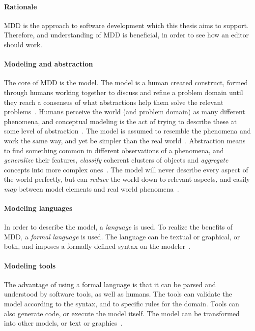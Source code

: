 \paragraph{Rationale}
\Acrfull{MDD} is the approach to software development which this thesis aims to support.
Therefore, and understanding of \acrshort{MDD} is beneficial, in order to see how an editor should work.

\paragraph{Modeling and abstraction}
The core of \acrshort{MDD} is the model.
The model is a human created construct, formed through humans working together to discuss and refine a problem domain until they reach a consensus of what abstractions help them solve the relevant problems~\cite[p.~154]{brambillaModeldrivenSoftwareEngineering2012}.
Humans perceive the world (and problem domain) as many different phenomena, and conceptual modeling is the act of trying to describe these at some level of abstraction~\cite[p.~1,408]{krogstieModelbasedDevelopmentEvolution2012}.
The model is assumed to resemble the phenomena and work the same way, and yet be simpler than the real world~\cite[p.~414]{krogstieModelbasedDevelopmentEvolution2012}.
Abstraction means to find something common in different observations of a phenomena, and \textit{generalize} their features, \textit{classify} coherent clusters of objects and \textit{aggregate} concepts into more complex ones~\cite[p.~1]{brambillaModeldrivenSoftwareEngineering2012}.
The model will never describe every aspect of the world perfectly, but can \textit{reduce} the world down to relevant aspects, and easily \textit{map} between model elements and real world phenomena~\cite[p.~1-2]{brambillaModeldrivenSoftwareEngineering2012}.


\paragraph{Modeling languages}
In order to describe the model, a \textit{language} is used.
To realize the benefits of \acrshort{MDD}, a \textit{formal language} is used.
The language can be textual or graphical, or both, and imposes a formally defined syntax on the modeler~\cite[p.~13]{brambillaModeldrivenSoftwareEngineering2012}.

\paragraph{Modeling tools}
The advantage of using a formal language is that it can be parsed and understood by software tools, as well as humans.
The tools can validate the model according to the syntax, and to specific rules for the domain.
Tools can also generate code, or execute the model itself.
The model can be transformed into other models, or text or graphics~\cite[p.~8]{brambillaModeldrivenSoftwareEngineering2012}.

